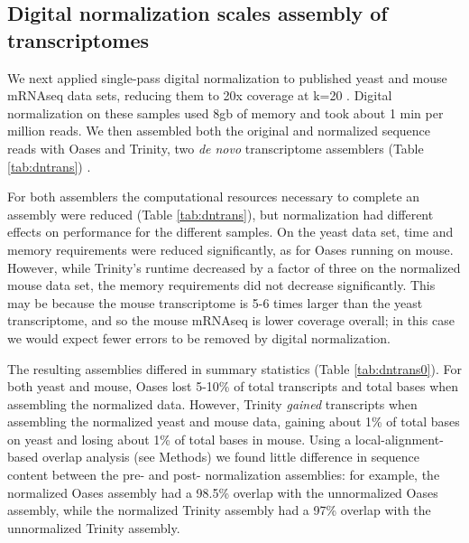\documentclass[10pt]{article}
\begin{document}


\subsection*{Digital normalization scales assembly of transcriptomes}

We next applied single-pass digital normalization to published yeast
and mouse mRNAseq data sets, reducing them to 20x coverage at k=20
\cite{pubmed21572440}.  Digital normalization on these samples used
8gb of memory and took about 1 min per million reads.  We then
assembled both the original and normalized sequence reads with Oases
and Trinity, two {\em de novo} transcriptome assemblers (Table
\ref{tab:dntrans}) \cite{pubmed22368243,pubmed21572440}.

For both assemblers the computational resources necessary to complete
an assembly were reduced (Table \ref{tab:dntrans}), but normalization
had different effects on performance for the different samples.  On the
yeast data set, time and memory requirements were reduced
significantly, as for Oases running on mouse.  However, while
Trinity's runtime decreased by a factor of three on the normalized
mouse data set, the memory requirements did not decrease
significantly.  This may be because the mouse transcriptome is 5-6
times larger than the yeast transcriptome, and so the mouse mRNAseq
is lower coverage overall; in this case we would expect fewer
errors to be removed by digital normalization.

The resulting assemblies differed in summary statistics (Table
\ref{tab:dntrans0}).  For both yeast and mouse, Oases lost 5-10\% of
total transcripts and total bases when assembling the normalized data.  However, Trinity {\em gained}
transcripts when assembling the normalized yeast and mouse data,
gaining about 1\% of total bases on yeast and losing about 1\%
of total bases in mouse.  Using a local-alignment-based overlap
analysis (see Methods) we found little difference in sequence
content between the pre- and post- normalization assemblies: for
example, the normalized Oases assembly had a 98.5\% overlap with the
unnormalized Oases assembly, while the normalized Trinity assembly had
a 97\% overlap with the unnormalized Trinity assembly.
\end{document}
